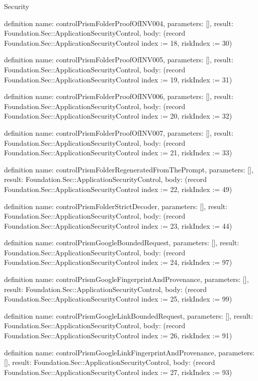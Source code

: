 \begin{lexlean}{Security}
\begin{semanticmodule}
definition{
  name: controlPrismFolderProofOfINV004,
  parameters: [],
  result: Foundation.Sec::ApplicationSecurityControl,
  body: (record Foundation.Sec::ApplicationSecurityControl {index := 18, riskIndex := 30})
}

definition{
  name: controlPrismFolderProofOfINV005,
  parameters: [],
  result: Foundation.Sec::ApplicationSecurityControl,
  body: (record Foundation.Sec::ApplicationSecurityControl {index := 19, riskIndex := 31})
}

definition{
  name: controlPrismFolderProofOfINV006,
  parameters: [],
  result: Foundation.Sec::ApplicationSecurityControl,
  body: (record Foundation.Sec::ApplicationSecurityControl {index := 20, riskIndex := 32})
}

definition{
  name: controlPrismFolderProofOfINV007,
  parameters: [],
  result: Foundation.Sec::ApplicationSecurityControl,
  body: (record Foundation.Sec::ApplicationSecurityControl {index := 21, riskIndex := 33})
}

definition{
  name: controlPrismFolderRegeneratedFromThePrompt,
  parameters: [],
  result: Foundation.Sec::ApplicationSecurityControl,
  body: (record Foundation.Sec::ApplicationSecurityControl {index := 22, riskIndex := 49})
}

definition{
  name: controlPrismFolderStrictDecoder,
  parameters: [],
  result: Foundation.Sec::ApplicationSecurityControl,
  body: (record Foundation.Sec::ApplicationSecurityControl {index := 23, riskIndex := 44})
}

definition{
  name: controlPrismGoogleBoundedRequest,
  parameters: [],
  result: Foundation.Sec::ApplicationSecurityControl,
  body: (record Foundation.Sec::ApplicationSecurityControl {index := 24, riskIndex := 97})
}

definition{
  name: controlPrismGoogleFingerprintAndProvenance,
  parameters: [],
  result: Foundation.Sec::ApplicationSecurityControl,
  body: (record Foundation.Sec::ApplicationSecurityControl {index := 25, riskIndex := 99})
}

definition{
  name: controlPrismGoogleLinkBoundedRequest,
  parameters: [],
  result: Foundation.Sec::ApplicationSecurityControl,
  body: (record Foundation.Sec::ApplicationSecurityControl {index := 26, riskIndex := 91})
}

definition{
  name: controlPrismGoogleLinkFingerprintAndProvenance,
  parameters: [],
  result: Foundation.Sec::ApplicationSecurityControl,
  body: (record Foundation.Sec::ApplicationSecurityControl {index := 27, riskIndex := 93})
}


\end{semanticmodule}
\end{lexlean}
